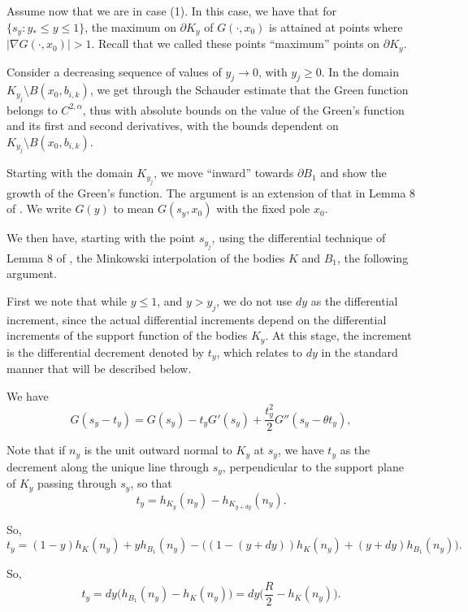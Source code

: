 \documentclass{article}
\theoremstyle{plain}
\theoremstyle{definition}
\theoremstyle{plain}
\begin{document}
\bigskip

Assume now that we are in case (1). In this case, we have that for $\{ s_y : y_* \le y \le 1 \}$, the maximum on $\partial K_y$ of $G(\cdot, x_0)$ is attained at points where $|\nabla G(\cdot, x_0)| > 1$. Recall that we called these points ``maximum'' points on $\partial K_y$.

Consider a decreasing sequence of values of $y_j \to 0$, with $y_j \ge 0$. In the domain $K_{y_j} \setminus B(x_0, b_{i,k})$, we get through the Schauder estimate that the Green function belongs to $C^{2,\alpha}$, thus with absolute bounds on the value of the Green's function and its first and second derivatives, with the bounds dependent on $K_{y_j} \setminus B(x_0, b_{i,k})$.


Starting with the domain $K_{y_j}$, we move ``inward'' towards $\partial B_1$ and show the growth of the Green's function. The argument is an extension of that in Lemma 8 of \cite{Pat25}. We write $G(y)$ to mean $G(s_y, x_0)$ with the fixed pole $x_0$.

We then have, starting with the point $s_{y_j}$, using the differential technique of Lemma 8 of \cite{Pat25}, the Minkowski interpolation of the bodies $K$ and $B_1$, the following argument.

First we note that while $y \le 1$, and $y > y_j$, we do not use $dy$ as the differential increment, since the actual differential increments depend on the differential increments of the support function of the bodies $K_y$. At this stage, the increment is the differential decrement denoted by $t_y$, which relates to $dy$ in the standard manner that will be described below.

We have
\begin{equation}
G(s_y - t_y) = G(s_y) - t_y G'(s_y) + \frac{t_y^2}{2} G''(s_y - \theta t_y),
\label{eq:1}
\end{equation}

Note that if $n_y$ is the unit outward normal to $K_y$ at $s_y$, we have $t_y$ as the decrement along the unique line through $s_y$, perpendicular to the support plane of $K_y$ passing through $s_y$, so that
\[
t_y = h_{K_y}(n_y) - h_{K_{y+dy}}(n_y).
\]

So,
\[
t_y = (1-y) h_K(n_y) + y h_{B_1}(n_y)
- \big( (1-(y+dy)) h_K(n_y) + (y+dy) h_{B_1}(n_y) \big).
\]

So,
\begin{equation}
t_y = dy\big(h_{B_1}(n_y) - h_K(n_y)\big)=dy\Big(\frac{R}{2}-h_K(n_y)\Big).
\end{equation}
\end{document}

